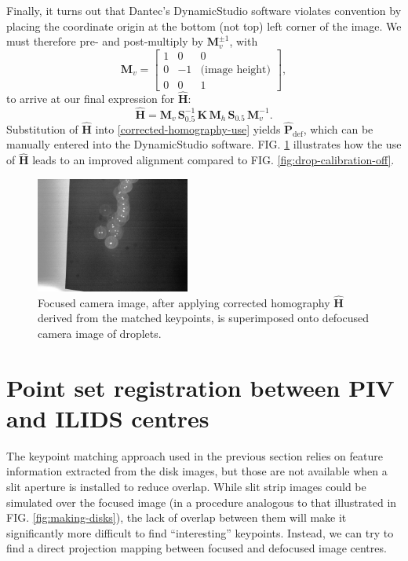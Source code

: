 \documentclass[floatfix,aip,rsi,reprint,graphicx]{revtex4-1}
\begin{document}
Finally, it turns out that Dantec's DynamicStudio software violates convention
by placing the coordinate origin at the bottom (not top) left corner of the
image. We must therefore pre- and post-multiply by $\mathbf{M}_v^{\pm 1}$, with
\begin{equation*}
    \mathbf{M}_v = \left[ \begin{array}{ccc}
            1 & 0 & 0 \\
    0 & -1 & \text{(image height)} \\
            0 & 0 & 1
    \end{array} \right],
\end{equation*}
to arrive at our final expression for $\mathbf{\hat{H}}$:
\begin{equation}
    \mathbf{\hat{H}} = \mathbf{M}_v\, \mathbf{S}_{0.5}^{-1}\, \mathbf{K}\,
    \mathbf{M}_h\, \mathbf{S}_{0.5}\, \mathbf{M}_v^{-1}.
\end{equation}
Substitution of $\mathbf{\hat{H}}$ into \eqref{corrected-homography-use} yields
$\mathbf{\hat{P}}_\text{def}$, which can be manually entered into the
DynamicStudio software. FIG. \ref{fig:drop-calibration-corrected} illustrates
how the use of $\mathbf{\hat{H}}$ leads to an improved alignment compared to
FIG. \ref{fig:drop-calibration-off}.

\begin{figure}
    \centering
    \includegraphics[width=0.45\textwidth]{orb_images/drop-calibration-corrected.jpg}
    \caption{Focused camera image, after applying corrected homography
        $\mathbf{\hat{H}}$ derived from the matched keypoints, is superimposed onto
    defocused camera image of droplets.}
    \label{fig:drop-calibration-corrected}
\end{figure}
\section{Point set registration between PIV and ILIDS centres}
The keypoint matching approach used in the previous section relies on feature
information extracted from the disk images, but those are not available when a
slit aperture is installed to reduce overlap. While slit strip images could be
simulated over the focused image (in a procedure analogous to that illustrated
in FIG.  \ref{fig:making-disks}), the lack of overlap between them will make it
significantly more difficult to find ``interesting'' keypoints. Instead, we can
try to find a direct projection mapping between focused and defocused image
centres.
\end{document}
